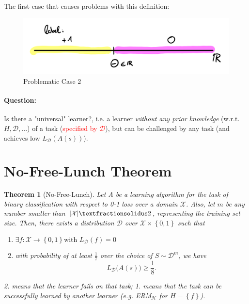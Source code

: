 \documentclass[10pt,a4paper]{article}
\newtheorem{theorem}{Theorem}[section]
\theoremstyle{remark}
\theoremstyle{definition}
\theoremstyle{plain}
\begin{document}
The first case that causes problems with this definition:
\begin{figure}[H]
	\centering
	\includegraphics[width=0.7\linewidth]{sketch_2}
	\caption{Problematic Case 2}
	\label{fig:sketch2}
\end{figure}

\paragraph{Question:} Is there a "universal" learner?, i.e. a learner \textit{without any prior knowledge} (w.r.t. $H, \mathcal{D, ...}$) of a task (\textcolor{red}{specified by $\mathcal{D}$}), but can be challenged by any task (and achieves low $L_\mathcal{D}\left(A\left(s\right)\right)$). 

\section{No-Free-Lunch Theorem}
\begin{theorem}[No-Free-Lunch]	
Let A be a learning algorithm for the task of binary classification with respect to 0-1 loss over a domain $\mathcal{X}$. Also, let $m$ be any number smaller than $|\mathcal{X}|\textfractionsolidus2$, representing the training set size. Then, there exists a distribution $\mathcal{D}$ over $\mathcal{X} \times \left\{0, 1\right\}$ such that 
\begin{enumerate}
	\item $\exists f: \mathcal{X} \to \left\{0,1\right\} \text{with } L_\mathcal{D}(f) = 0$
	 \item with probability of at least $\frac{1}{7}$ over the choice of $S \sim \mathcal{D}^m$, we have\\
	 $$ L_\mathcal{D}\big(A(s)\big) \geq \frac{1}{8}.$$
\end{enumerate}
2. means that the learner fails on that task; 1. means that the task can be successfully learned by another learner (e.g. ERM$_{\mathcal{H}}$ for $H = \left\{f\right\}$).
\end{theorem}
\end{document}
